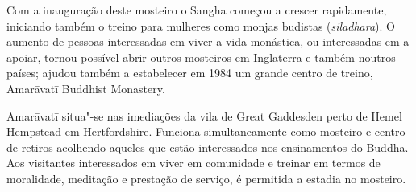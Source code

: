 \enlargethispage{\baselineskip}

Com a inauguração deste mosteiro o Sangha começou a crescer rapidamente,
iniciando também o treino para mulheres como monjas budistas (\emph{siladhara}).
O aumento de pessoas interessadas em viver a vida monástica, ou interessadas em
a apoiar, tornou possível abrir outros mosteiros em Inglaterra e também noutros
países; ajudou também a estabelecer em 1984 um grande centro de treino,
Amarāvatī Buddhist Monastery.

Amarāvatī situa"-se nas imediações da vila de Great Gaddesden perto de Hemel
Hempstead em Hertfordshire. Funciona simultaneamente como mosteiro e centro de
retiros acolhendo aqueles que estão interessados nos ensinamentos do Buddha. Aos
visitantes interessados em viver em comunidade e treinar em termos de
moralidade, meditação e prestação de serviço, é permitida a estadia no mosteiro.

